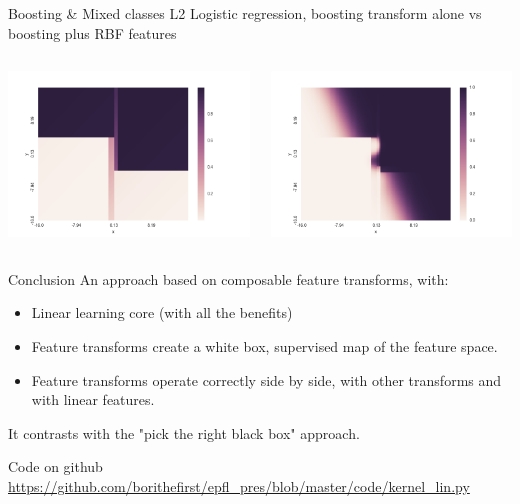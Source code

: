 \documentclass[11pt]{beamer}
\begin{document}
\begin{frame}{Boosting \& Mixed classes}
L2 Logistic regression, boosting transform alone vs boosting plus RBF features
\begin{columns}
\includegraphics[scale=0.3]{boosting_only_hm.png} 

\includegraphics[scale=0.3]{boosting_nys_hm.png} 
\end{columns}

\end{frame}

\begin{frame}{Conclusion}
An approach based on composable feature transforms, with:
\begin{itemize}
\item Linear learning core (with all the benefits)
\item Feature transforms create a white box, supervised map of the feature space.
\item Feature transforms operate correctly side by side, with other transforms and with linear features.
\end{itemize}
It contrasts with the "pick the right black box" approach.

Code on github \url{https://github.com/borithefirst/epfl_pres/blob/master/code/kernel_lin.py}
\end{frame}
\end{document}
